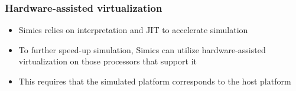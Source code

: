\begin{frame}
\frametitle{Hardware-assisted virtualization}

\begin{itemize}
	\item Simics relies on interpretation and JIT to accelerate simulation
	\item To further speed-up simulation, Simics can utilize hardware-assisted virtualization on those processors that support it
	\item This requires that the simulated platform corresponds to the host platform
\end{itemize}

\end{frame}
